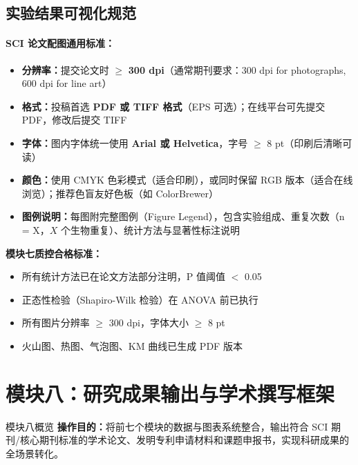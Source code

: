 \documentclass[12pt,a4paper,twoside]{article}
\begin{document}
\subsection{实验结果可视化规范}
\label{sec:module7_exp_vis}

\paragraph{SCI 论文配图通用标准：}

\begin{itemize}
  \item \textbf{分辨率：}提交论文时 $\geq$ \textbf{300 dpi}（通常期刊要求：300 dpi for photographs, 600 dpi for line art）
  \item \textbf{格式：}投稿首选 \textbf{PDF 或 TIFF 格式}（EPS 可选）；在线平台可先提交 PDF，修改后提交 TIFF
  \item \textbf{字体：}图内字体统一使用 \textbf{Arial 或 Helvetica}，字号 $\geq$ 8 pt（印刷后清晰可读）
  \item \textbf{颜色：}使用 CMYK 色彩模式（适合印刷），或同时保留 RGB 版本（适合在线浏览）；推荐色盲友好色板（如 ColorBrewer）
  \item \textbf{图例说明：}每图附完整图例（Figure Legend），包含实验组成、重复次数（n = X，$X$ 个生物重复）、统计方法与显著性标注说明
\end{itemize}

\begin{qcbox}
\textbf{模块七质控合格标准：}
\begin{itemize}
  \item 所有统计方法已在论文方法部分注明，P 值阈值 $<$ 0.05 
  \item 正态性检验（Shapiro-Wilk 检验）在 ANOVA 前已执行 
  \item 所有图片分辨率 $\geq$ 300 dpi，字体大小 $\geq$ 8 pt 
  \item 火山图、热图、气泡图、KM 曲线已生成 PDF 版本 
\end{itemize}
\end{qcbox}

\section{模块八：研究成果输出与学术撰写框架}
\label{sec:module8}

\begin{infobox}{模块八概览}
\textbf{操作目的：}将前七个模块的数据与图表系统整合，输出符合 SCI 期刊/核心期刊标准的学术论文、发明专利申请材料和课题申报书，实现科研成果的全场景转化。
\end{infobox}
\end{document}
